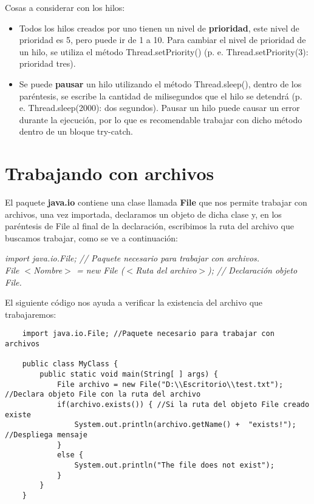 Cosas a considerar con los hilos:
\begin{itemize}
    \item Todos los hilos creados por uno tienen un nivel de \textbf{prioridad}, este nivel de prioridad es 5, pero puede ir de 1 a 10. Para cambiar el nivel de prioridad de un hilo, se utiliza el método Thread.setPriority() (p. e. Thread.setPriority(3): prioridad tres).
    \item Se puede \textbf{pausar} un hilo utilizando el método Thread.sleep(), dentro de los paréntesis, se escribe la cantidad de milisegundos que el hilo se detendrá (p. e. Thread.sleep(2000): dos segundos). Pausar un hilo puede causar un error durante la ejecución, por lo que es recomendable trabajar con dicho método dentro de un bloque try-catch.
\end{itemize}



\section{Trabajando con archivos}
\hspace{0.55cm}El paquete \textbf{java.io} contiene una clase llamada \textbf{File} que nos permite trabajar con archivos, una vez importada, declaramos un objeto de dicha clase y, en los paréntesis de File al final de la declaración, escribimos la ruta del archivo que buscamos trabajar, como se ve a continuación:
\begin{center}
    \textit{
        import java.io.File; // Paquete necesario para trabajar con archivos. \\
        File $<$Nombre$>$ = new File ($<$Ruta del archivo$>$); // Declaración objeto File.
    }
\end{center}

El siguiente código nos ayuda a verificar la existencia del archivo que trabajaremos:
\begin{lstlisting}
    import java.io.File; //Paquete necesario para trabajar con archivos

    public class MyClass {
        public static void main(String[ ] args) {
            File archivo = new File("D:\\Escritorio\\test.txt"); //Declara objeto File con la ruta del archivo
            if(archivo.exists()) { //Si la ruta del objeto File creado existe
                System.out.println(archivo.getName() +  "exists!"); //Despliega mensaje
            }
            else { 
                System.out.println("The file does not exist");
            }
        }
    }
\end{lstlisting}


